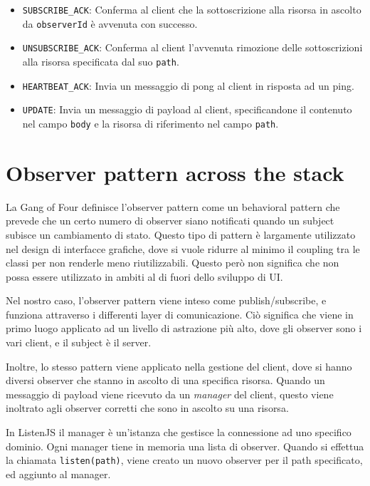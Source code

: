 \documentclass[12pt,a4paper,openright,twoside]{report}
\begin{document}
\begin{itemize}
\begin{itemize}
  \item \lstinline{SUBSCRIBE_ACK}: Conferma al client che la sottoscrizione alla risorsa in ascolto da \lstinline{observerId} è avvenuta con successo.
  \item \lstinline{UNSUBSCRIBE_ACK}: Conferma al client l'avvenuta rimozione delle sottoscrizioni alla risorsa specificata dal suo \lstinline{path}.
  \item \lstinline{HEARTBEAT_ACK}: Invia un messaggio di pong al client in risposta ad un ping.
  \item \lstinline{UPDATE}: Invia un messaggio di payload al client, specificandone il contenuto nel campo \lstinline{body} e la risorsa di riferimento nel campo \lstinline{path}.
  \end{itemize}
\end{itemize}

\section{Observer pattern across the stack}
La Gang of Four definisce l'observer pattern\cite{observer} come un behavioral pattern che prevede che un certo numero di observer siano notificati quando un subject subisce un cambiamento di stato. Questo tipo di pattern è largamente utilizzato nel design di interfacce grafiche, dove si vuole ridurre al minimo il coupling tra le classi per non renderle meno riutilizzabili. Questo però non significa che non possa essere utilizzato in ambiti al di fuori dello sviluppo di UI.

\bigskip

Nel nostro caso, l'observer pattern viene inteso come publish/subscribe, e funziona attraverso i differenti layer di comunicazione. Ciò significa che viene in primo luogo applicato ad un livello di astrazione più alto, dove gli observer sono i vari client, e il subject è il server.

Inoltre, lo stesso pattern viene applicato nella gestione del client, dove si hanno diversi observer che stanno in ascolto di una specifica risorsa. Quando un messaggio di payload viene ricevuto da un \textit{manager} del client, questo viene inoltrato agli observer corretti che sono in ascolto su una risorsa.

In ListenJS il manager è un'istanza che gestisce la connessione ad uno specifico dominio. Ogni manager tiene in memoria una lista di observer. Quando si effettua la chiamata \lstinline{listen(path)}, viene creato un nuovo observer per il path specificato, ed aggiunto al manager.
\end{document}
